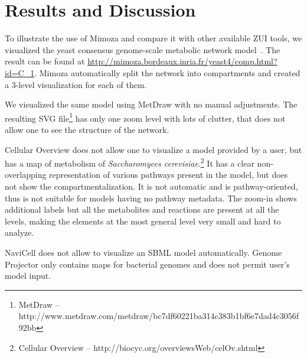 \documentclass{bmcart}
\begin{document}
\section*{Results and Discussion}
To illustrate the use of Mimoza and compare it with other available ZUI tools, we visualized the yeast consensus genome-scale metabolic network model~\cite{Herrgard2008}. The result can be found at \url{http://mimoza.bordeaux.inria.fr/yeast4/comp.html?id=C_1}. Mimoza automatically split the network into compartments and created a 3-level visualization for each of them.

We visualized the same model using MetDraw with no manual adjustments. The resulting SVG file\footnote{MetDraw -- http://www.metdraw.com/metdraw/bc7df60221ba314c383b1bf6e7dad4c3056f92bb} has only one zoom level with lots of clutter, that does not allow one to see the structure of the network.

Cellular Overview does not allow one to visualize a model provided by a user, but has a map of metabolism of \emph{Saccharomyces cerevisiae}.\footnote{Cellular Overview -- http://biocyc.org/overviewsWeb/celOv.shtml} It has a clear non-overlapping representation of various pathways present in the model, but does not show the compartmentalization. It is not automatic and is pathway-oriented, thus is not suitable for models having no pathway metadata. The zoom-in shows additional labels but all the metabolites and reactions are present at all the levels, making the elements at the most general level very small and hard to analyze.

NaviCell does not allow to visualize an SBML model automatically. Genome Projector only contains maps for bacterial genomes and does not permit user's model input.
\end{document}
